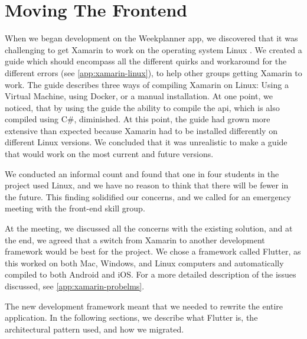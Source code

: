 \section{Moving The Frontend}\label{sec:MovingTheFrontend}

When we began development on the Weekplanner app, we discovered that it was challenging to get Xamarin to work on the operating system Linux . We created a guide which should encompass all the different quirks and workaround for the different errors (see \autoref{app:xamarin-linux}), to help other groups getting Xamarin to work. The guide describes three ways of compiling Xamarin on Linux: Using a Virtual Machine, using Docker, or a manual installation. At one point, we noticed, that by using the guide the ability to compile the \gls{api}, which is also compiled using C\#, diminished. At this point, the guide had grown more extensive than expected because Xamarin had to be installed differently on different Linux versions. We concluded that it was unrealistic to make a guide that would work on the most current and future versions.

We conducted an informal count and found that one in four students in the project used Linux, and we have no reason to think that there will be fewer in the future. This finding solidified our concerns, and we called for an emergency meeting with the front-end skill group.

At the meeting, we discussed all the concerns with the existing solution, and at the end, we agreed that a switch from Xamarin to another development framework would be best for the project. We chose a framework called Flutter\cite{flutter:website}, as this worked on both Mac, Windows, and Linux computers and automatically compiled to both Android and iOS. For a more detailed description of the issues discussed, see \autoref{app:xamarin-probelms}.

The new development framework meant that we needed to rewrite the entire application. In the following sections, we describe what Flutter is, the architectural pattern used, and how we migrated.
